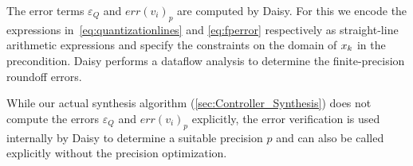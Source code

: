 

The error terms $\varepsilon_Q$ and $err(v_{i})_{p}$ are computed by Daisy. For this we encode
the expressions in~\autoref{eq:quantizationlines} and \autoref{eq:fperror}
respectively as straight-line arithmetic expressions and specify the constraints
on the domain of $x_{k}$ in the precondition.
Daisy performs a dataflow analysis to determine the finite-precision roundoff
errors. 

While our actual synthesis algorithm (\autoref{sec:Controller_Synthesis}) does
not compute the errors $\varepsilon_Q$ and $err(v_{i})_{p}$ explicitly, the
error verification is used internally by Daisy to determine a suitable precision
$p$ and can also be called explicitly without the precision optimization.


